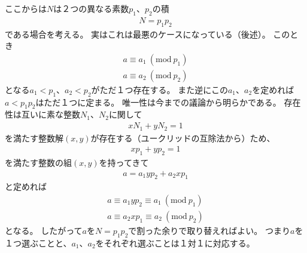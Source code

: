 \documentclass[a4paper, 10pt]{jsarticle}
\begin{document}
ここからは$N$は２つの異なる素数$p_1$、$p_2$の積
\begin{align}
	N = p_1 p_2
\end{align}
である場合を考える。
実はこれは最悪のケースになっている（後述）。
このとき
\begin{gather}
	a \equiv a_1 \ (\mathrm{mod} \ p_1) \\
	a \equiv a_2 \ (\mathrm{mod} \ p_2)
\end{gather}
となる$a_1 < p_1$、$a_2 < p_2$がただ１つ存在する。
また逆にこの$a_1$、$a_2$を定めれば$a < p_1 p_2$はただ１つに定まる。
唯一性は今までの議論から明らかである。
存在性は互いに素な整数$N_1$、$N_2$に関して
\begin{align}
	x N_1 + y N_2 = 1
\end{align}
を満たす整数解$(x, y)$が存在する（ユークリッドの互除法から）ため、
\begin{align}
	x p_1 + y p_2 = 1
\end{align}
を満たす整数の組$(x, y)$を持ってきて
\begin{align}
	a = a_1 y p_2 + a_2 x p_1
\end{align}
と定めれば
\begin{gather}
	a \equiv a_1 y p_2 \equiv a_1 \ (\mathrm{mod} \ p_1) \\
	a \equiv a_2 x p_1 \equiv a_2 \ (\mathrm{mod} \ p_2)
\end{gather}
となる。
したがって$a$を$N = p_1 p_2$で割った余りで取り替えればよい。
つまり$a$を１つ選ぶことと、$a_1$、$a_2$をそれぞれ選ぶことは１対１に対応する。
\end{document}

